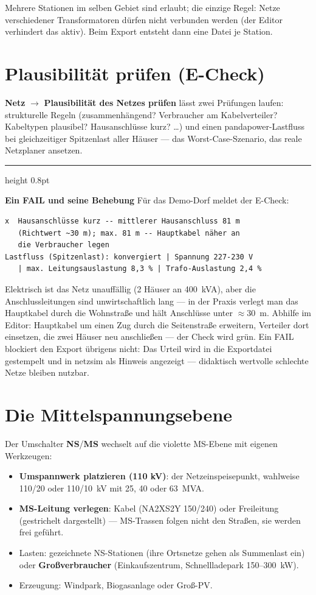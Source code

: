 \documentclass[11pt,a4paper,parskip=half]{scrreprt}
\newcommand{\ui}[1]{\textsf{\bfseries #1}}          %
\newenvironment{beispiel}[1][Beispiel]
  {\par\medskip
   {\color{bsp}\hrule height 0.8pt}\nopagebreak\smallskip
   \noindent\textbf{\textsf{\textcolor{bsp}{#1}}}\quad\ignorespaces}
  {\par\nopagebreak\smallskip{\color{bsp}\hrule height 0.8pt}\par\medskip}
\begin{document}
Mehrere Stationen im selben Gebiet sind erlaubt; die einzige Regel:
Netze verschiedener Transformatoren dürfen nicht verbunden werden
(der Editor verhindert das aktiv). Beim Export entsteht dann eine
Datei je Station.

\section{Plausibilität prüfen (E-Check)}

\ui{Netz} $\rightarrow$ \ui{Plausibilität des Netzes prüfen} lässt
zwei Prüfungen laufen: strukturelle Regeln (zusammenhängend?
Verbraucher am Kabelverteiler? Kabeltypen plausibel? Hausanschlüsse
kurz? \ldots) und einen pandapower-Lastfluss bei gleichzeitiger
Spitzenlast aller Häuser --- das Worst-Case-Szenario, das reale
Netzplaner ansetzen.

\begin{beispiel}[Ein FAIL und seine Behebung]
Für das Demo-Dorf meldet der E-Check:
\begin{lstlisting}
x  Hausanschlüsse kurz -- mittlerer Hausanschluss 81 m
   (Richtwert ~30 m); max. 81 m -- Hauptkabel näher an
   die Verbraucher legen
Lastfluss (Spitzenlast): konvergiert | Spannung 227-230 V
   | max. Leitungsauslastung 8,3 % | Trafo-Auslastung 2,4 %
\end{lstlisting}
Elektrisch ist das Netz unauffällig (2 Häuser an 400~kVA), aber die
Anschlussleitungen sind unwirtschaftlich lang --- in der Praxis
verlegt man das Hauptkabel durch die Wohnstraße und hält Anschlüsse
unter $\approx$30~m. Abhilfe im Editor: Hauptkabel um einen Zug durch
die Seitenstraße erweitern, Verteiler dort einsetzen, die zwei
Häuser neu anschließen --- der Check wird grün. Ein FAIL blockiert
den Export übrigens nicht: Das Urteil wird in die Exportdatei
gestempelt und in netzsim als Hinweis angezeigt --- didaktisch
wertvolle \glqq schlechte\grqq{} Netze bleiben nutzbar.
\end{beispiel}

\section{Die Mittelspannungsebene}

Der Umschalter \ui{NS}/\ui{MS} wechselt auf die violette MS-Ebene mit
eigenen Werkzeugen:

\begin{itemize}[nosep]
  \item \ui{Umspannwerk platzieren (110 kV)}: der Netzeinspeisepunkt,
    wahlweise 110/20 oder 110/10~kV mit 25, 40 oder 63~MVA.
  \item \ui{MS-Leitung verlegen}: Kabel (NA2XS2Y 150/240) oder
    Freileitung (gestrichelt dargestellt) --- MS-Trassen folgen
    nicht den Straßen, sie werden frei geführt.
  \item Lasten: gezeichnete NS-Stationen (ihre Ortsnetze gehen als
    Summenlast ein) oder \ui{Großverbraucher} (Einkaufszentrum,
    Schnellladepark 150--300~kW).
  \item Erzeugung: Windpark, Biogasanlage oder Groß-PV.
\end{itemize}
\end{document}
